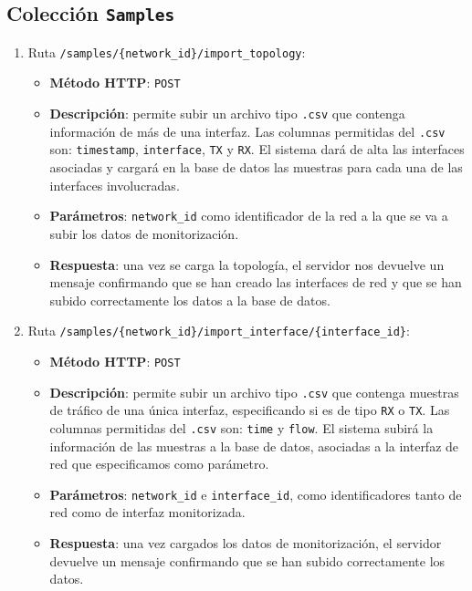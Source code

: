 \documentclass[a4paper, oneside, 12pt]{book}
\begin{document}
	\subsection{Colección \texttt{Samples}}
	
	\begin{enumerate}
		\item Ruta \texttt{/samples/\{network\_id\}/import\_topology}:
		
		\begin{itemize}
			\item \textbf{Método HTTP}: \texttt{POST}
			\item \textbf{Descripción}: permite subir un archivo tipo \texttt{.csv} que contenga información de más de una interfaz. Las columnas permitidas del \texttt{.csv} son: \texttt{timestamp}, \texttt{interface}, \texttt{TX} y \texttt{RX}. El sistema dará de alta las interfaces asociadas y cargará en la base de datos las muestras para cada una de las interfaces involucradas.
			\item \textbf{Parámetros}: \texttt{network\_id} como identificador de la red a la que se va a subir los datos de monitorización.
			\item \textbf{Respuesta}: una vez se carga la topología, el servidor nos devuelve un mensaje confirmando que se han creado las interfaces de red y que se han subido correctamente los datos a la base de datos.
		\end{itemize}
	
		\item Ruta \texttt{/samples/\{network\_id\}/import\_interface/\{interface\_id\}}:
		
		\begin{itemize}
			\item \textbf{Método HTTP}: \texttt{POST}
			\item \textbf{Descripción}: permite subir un archivo tipo \texttt{.csv} que contenga muestras de tráfico de una única interfaz, especificando si es de tipo \texttt{RX} o \texttt{TX}. Las columnas permitidas del \texttt{.csv} son: \texttt{time} y \texttt{flow}. El sistema subirá la información de las muestras a la base de datos, asociadas a la interfaz de red que especificamos como parámetro.
			\item \textbf{Parámetros}: \texttt{network\_id} e \texttt{interface\_id}, como identificadores tanto de red como de interfaz monitorizada.
			\item \textbf{Respuesta}: una vez cargados los datos de monitorización, el servidor devuelve un mensaje confirmando que se han subido correctamente los datos.
		\end{itemize}
	\end{enumerate}
	
\end{document}
